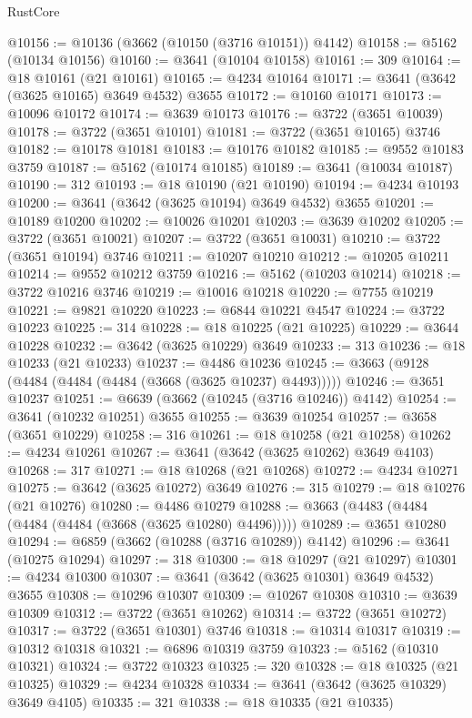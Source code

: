 \begin{lexlean}{RustCore}
\begin{coremodule}
@10156 := @10136 (@3662 (@10150 (@3716 @10151)) @4142)
@10158 := @5162 (@10134 @10156)
@10160 := @3641 (@10104 @10158)
@10161 := 309
@10164 := @18 @10161 (@21 @10161)
@10165 := @4234 @10164
@10171 := @3641 (@3642 (@3625 @10165) @3649 @4532) @3655
@10172 := @10160 @10171
@10173 := @10096 @10172
@10174 := @3639 @10173
@10176 := @3722 (@3651 @10039)
@10178 := @3722 (@3651 @10101)
@10181 := @3722 (@3651 @10165) @3746
@10182 := @10178 @10181
@10183 := @10176 @10182
@10185 := @9552 @10183 @3759
@10187 := @5162 (@10174 @10185)
@10189 := @3641 (@10034 @10187)
@10190 := 312
@10193 := @18 @10190 (@21 @10190)
@10194 := @4234 @10193
@10200 := @3641 (@3642 (@3625 @10194) @3649 @4532) @3655
@10201 := @10189 @10200
@10202 := @10026 @10201
@10203 := @3639 @10202
@10205 := @3722 (@3651 @10021)
@10207 := @3722 (@3651 @10031)
@10210 := @3722 (@3651 @10194) @3746
@10211 := @10207 @10210
@10212 := @10205 @10211
@10214 := @9552 @10212 @3759
@10216 := @5162 (@10203 @10214)
@10218 := @3722 @10216 @3746
@10219 := @10016 @10218
@10220 := @7755 @10219
@10221 := @9821 @10220
@10223 := @6844 @10221 @4547
@10224 := @3722 @10223
@10225 := 314
@10228 := @18 @10225 (@21 @10225)
@10229 := @3644 @10228
@10232 := @3642 (@3625 @10229) @3649
@10233 := 313
@10236 := @18 @10233 (@21 @10233)
@10237 := @4486 @10236
@10245 := @3663 (@9128 (@4484 (@4484 (@4484 (@3668 (@3625 @10237) @4493)))))
@10246 := @3651 @10237
@10251 := @6639 (@3662 (@10245 (@3716 @10246)) @4142)
@10254 := @3641 (@10232 @10251) @3655
@10255 := @3639 @10254
@10257 := @3658 (@3651 @10229)
@10258 := 316
@10261 := @18 @10258 (@21 @10258)
@10262 := @4234 @10261
@10267 := @3641 (@3642 (@3625 @10262) @3649 @4103)
@10268 := 317
@10271 := @18 @10268 (@21 @10268)
@10272 := @4234 @10271
@10275 := @3642 (@3625 @10272) @3649
@10276 := 315
@10279 := @18 @10276 (@21 @10276)
@10280 := @4486 @10279
@10288 := @3663 (@4483 (@4484 (@4484 (@4484 (@3668 (@3625 @10280) @4496)))))
@10289 := @3651 @10280
@10294 := @6859 (@3662 (@10288 (@3716 @10289)) @4142)
@10296 := @3641 (@10275 @10294)
@10297 := 318
@10300 := @18 @10297 (@21 @10297)
@10301 := @4234 @10300
@10307 := @3641 (@3642 (@3625 @10301) @3649 @4532) @3655
@10308 := @10296 @10307
@10309 := @10267 @10308
@10310 := @3639 @10309
@10312 := @3722 (@3651 @10262)
@10314 := @3722 (@3651 @10272)
@10317 := @3722 (@3651 @10301) @3746
@10318 := @10314 @10317
@10319 := @10312 @10318
@10321 := @6896 @10319 @3759
@10323 := @5162 (@10310 @10321)
@10324 := @3722 @10323
@10325 := 320
@10328 := @18 @10325 (@21 @10325)
@10329 := @4234 @10328
@10334 := @3641 (@3642 (@3625 @10329) @3649 @4105)
@10335 := 321
@10338 := @18 @10335 (@21 @10335)

\end{coremodule}
\end{lexlean}
